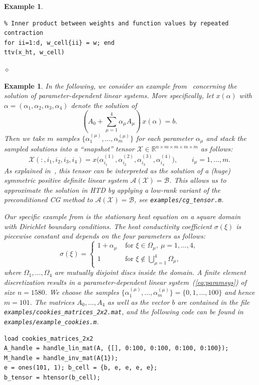 \documentclass[11pt, a4paper]{article}
\newcommand{\calA}{\mathcal{A}}
\newcommand{\calB}{\mathcal{B}}
\newcommand{\calX}{\mathcal{X}}
\newcommand{\R}{{\mathbb R}}
\newtheorem{example}[theorem]{\bf Example}
\begin{document}
\begin{example}
\begin{framed}
\begin{verbatim}
% Inner product between weights and function values by repeated contraction
for ii=1:d, w_cell{ii} = w; end
ttv(x_ht, w_cell)
\end{verbatim} 
\vspace{-2ex}
\end{framed}
\hfill $\diamond$
\end{example}

\begin{example} \rm
  \label{example:cookies}
In the following, we consider an example from~\cite{KreT10b}
concerning the solution of parameter-dependent linear systems.
More specifically, let $x(\alpha)$ with $\alpha = (\alpha_1,\alpha_2,\alpha_3,\alpha_4)$ denote the solution of
\begin{equation} \label{eq:paramsys}
\left(A_0 + \sum_{\mu=1}^4 \alpha_\mu A_\mu\right) \, x(\alpha) = b.
\end{equation}
Then we take $m$ samples $\{ \alpha^{(\mu)}_1, \ldots, \alpha^{(\mu)}_m \}$ for each parameter $\alpha_{\mu}$ and stack the sampled solutions into
a ``snapshot'' tensor $\calX \in \R^{n \times m \times m \times m \times m}$ as follows:
\[
 \calX(:, i_1, i_2, i_3, i_4) = x\Big(\alpha^{(1)}_{i_1}, \alpha^{(2)}_{i_2}, \alpha^{(3)}_{i_3}, \alpha^{(4)}_{i_4} \Big), \qquad i_\mu = 1,\ldots,m.
\]
As explained in~\cite{KreT10b}, this tensor can be interpreted as the solution of a (huge) symmetric positive definite linear system $\calA(\calX) = \calB$. This allows us to approximate the solution in HTD
by applying a low-rank variant of the preconditioned CG
method to $\calA(\calX) = \calB$, see \texttt{examples/cg\_tensor.m}.

Our specific example from \cite[Sec. 4]{KreT10b} is the stationary heat equation on a square domain with Dirichlet boundary conditions. The heat conductivity coefficient $\sigma(\xi)$ is piecewise constant and depends on the four parameters as follows:
\[
\sigma(\xi) = 
\left\{ \begin{array}{cl}
1 + \alpha_\mu  & \text{ for } \xi \in \Omega_\mu,\ \mu = 1,\ldots, 4,\\
1             & \text{ for } \xi \notin \bigcup_{\mu=1}^4 \Omega_\mu,
\end{array} \right.
\]
where $\Omega_1, \ldots, \Omega_4$ are mutually disjoint discs inside
the domain. A finite element discretization results in a
parameter-dependent linear system~(\ref{eq:paramsys}) of size $n =
1580$. We choose the samples $\{ \alpha^{(\mu)}_1, \ldots,
\alpha^{(\mu)}_m \} = \{ 0, 1, \ldots, 100 \}$ and hence $m =
101$. The matrices $A_0, \ldots, A_4$ as well as the vector $b$ are contained in the file \texttt{examples/cookies\_matrices\_2x2.mat}, and the following code can be found in \texttt{examples/example\_cookies.m}.
\begin{framed}\small \noindent
\vspace{-3ex} 
\begin{verbatim}
load cookies_matrices_2x2
A_handle = handle_lin_mat(A, {[], 0:100, 0:100, 0:100, 0:100});
M_handle = handle_inv_mat(A{1});
e = ones(101, 1); b_cell = {b, e, e, e, e};
b_tensor = htensor(b_cell);


\end{verbatim}
\end{framed}
\end{example}
\end{document}
